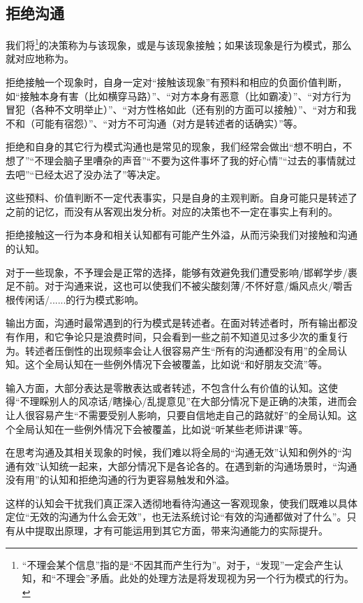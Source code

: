 \subsection{拒绝沟通}
我们将\footnote{“不理会某个信息”指的是“不因其而产生行为”。对于\rigorous，“发现”一定会产生认知，和“不理会”矛盾。此处的处理方法是将发现视为另一个行为模式的行为。}的决策称为与该现象，或是与该现象接触；如果该现象是行为模式，那么就对应地称为。
\begin{explain}
拒绝接触一个现象时，自身一定对“接触该现象”有预料和相应的负面价值判断，如“接触本身有害（比如横穿马路）”、“对方本身有恶意（比如霸凌）”、“对方行为冒犯（各种不文明举止）”、“对方性格如此（还有别的方面可以接触）”、“对方和我不和（可能有宿怨）”、“对方不可沟通（对方是转述者的话确实）”等。

拒绝和自身的其它行为模式沟通也是常见的现象，我们经常会做出“想不明白，不想了”“不理会脑子里嘈杂的声音”“不要为这件事坏了我的好心情”“过去的事情就过去吧”“已经太迟了没办法了”等决定。

这些预料、价值判断不一定代表事实，只是自身的主观判断。自身可能只是转述了之前的记忆，而没有从客观出发分析。对应的决策也不一定在事实上有利的。
\end{explain}
拒绝接触这一行为本身和相关认知都有可能产生外溢，从而污染我们对接触和沟通的认知。
\begin{explain}
对于一些现象，不予理会是正常的选择，能够有效避免我们遭受影响/邯郸学步/裹足不前。对于沟通来说，这也可以使我们不被尖酸刻薄/不怀好意/煽风点火/嚼舌根传闲话/......的行为模式影响。

输出方面，沟通时最常遇到的行为模式是转述者。在面对转述者时，所有输出都没有作用，和它争论只是浪费时间，只会看到一些之前不知道见过多少次的重复行为。转述者压倒性的出现频率会让人很容易产生“所有的沟通都没有用”的全局认知。这个全局认知在一些例外情况下会被覆盖，比如说“和好朋友交流”等。

输入方面，大部分表达是零散表达或者转述，不包含什么有价值的认知。这使得“不理睬别人的风凉话/瞎操心/乱提意见”在大部分情况下是正确的决策，进而会让人很容易产生“不需要受别人影响，只要自信地走自己的路就好”的全局认知。这个全局认知在一些例外情况下会被覆盖，比如说“听某些老师讲课”等。

在思考沟通及其相关现象的时候，我们难以将全局的“沟通无效”认知和例外的“沟通有效”认知统一起来，大部分情况下是各论各的。在遇到新的沟通场景时，“沟通没有用”的认知和拒绝沟通的行为更容易触发和外溢。

这样的认知会干扰我们真正深入透彻地看待沟通这一客观现象，使我们既难以具体定位“无效的沟通为什么会无效”，也无法系统讨论“有效的沟通都做对了什么”。只有从中提取出原理，才有可能运用到其它方面，带来沟通能力的实际提升。
\end{explain}

